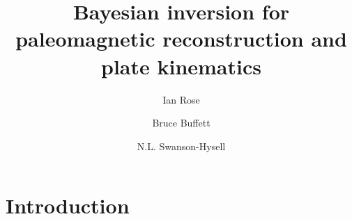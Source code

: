 \documentclass[preprint,12pt,authoryear]{elsarticle}
\begin{document}
\begin{frontmatter}



\title{Bayesian inversion for paleomagnetic reconstruction and plate kinematics}


\author{Ian Rose}
\author{Bruce Buffett}
\author{N.L. Swanson-Hysell}


\address{}

\begin{abstract}

\end{abstract}

\begin{keyword}



\end{keyword}

\end{frontmatter}

\linenumbers

\section{Introduction}
\label{sec:introduction}
\end{document}
